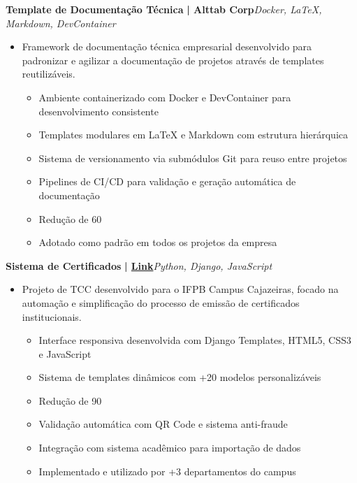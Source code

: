 \documentclass[a4paper]{article}
\begin{document}
{\textbf{Template de Documentação Técnica}}\textbf{ | Alttab Corp}\hfill{\sl Docker, LaTeX, Markdown, DevContainer}\\
\vspace{-3mm}
\begin{itemize} \itemsep -3pt
    \item[] Framework de documentação técnica empresarial desenvolvido para padronizar e agilizar a documentação de projetos através de templates reutilizáveis.
        \begin{itemize}
            \item Ambiente containerizado com Docker e DevContainer para desenvolvimento consistente
            \item Templates modulares em LaTeX e Markdown com estrutura hierárquica
            \item Sistema de versionamento via submódulos Git para reuso entre projetos
            \item Pipelines de CI/CD para validação e geração automática de documentação
            \item Redução de 60%
            \item Adotado como padrão em todos os projetos da empresa
        \end{itemize}
\end{itemize}
\vspace*{2mm}

{\textbf{Sistema de Certificados}}\textbf{ | \href{https://github.com/bodescorp/Cext-final-}{Link}}\hfill{\sl Python, Django, JavaScript}\\
\vspace{-3mm}
\begin{itemize} \itemsep -3pt
    \item[] Projeto de TCC desenvolvido para o IFPB Campus Cajazeiras, focado na automação e simplificação do processo de emissão de certificados institucionais.
        \begin{itemize}
            \item Interface responsiva desenvolvida com Django Templates, HTML5, CSS3 e JavaScript
            \item Sistema de templates dinâmicos com +20 modelos personalizáveis
            \item Redução de 90%
            \item Validação automática com QR Code e sistema anti-fraude
            \item Integração com sistema acadêmico para importação de dados
            \item Implementado e utilizado por +3 departamentos do campus
        \end{itemize}
\end{itemize}
\vspace*{2mm}
\end{document}
